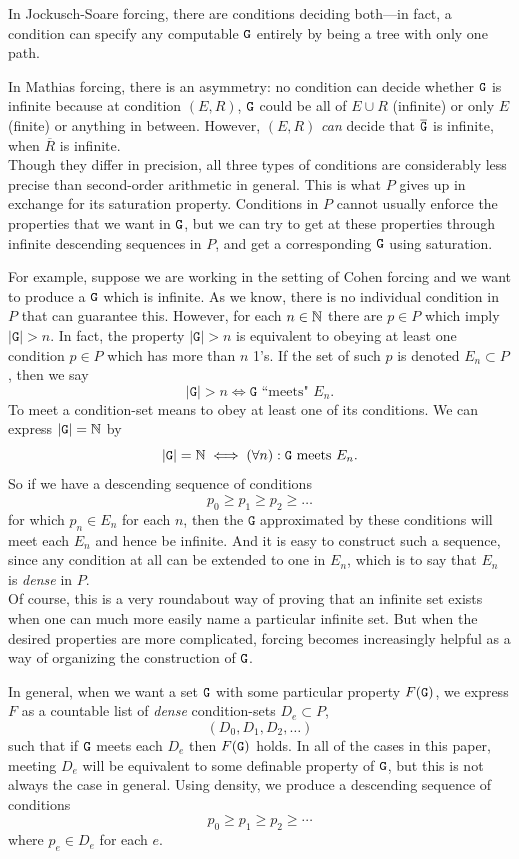 \documentclass{amsart}
\begin{document}
	In Jockusch-Soare forcing, there are conditions deciding both---in fact, a condition can specify any computable $\tt{G}$ entirely by being a tree with only one path.
	
	In Mathias forcing, there is an asymmetry: no condition can decide whether $\tt{G}$ is infinite because at condition $(E,R)$, $\tt{G}$ could be all of $E\cup R$ (infinite) or only $E$ (finite) or anything in between. However, $(E,R)$ \textit{can} decide that $\overline{\tt{G}}$ is infinite, when $\overline{R}$ is infinite.\\
	
	Though they differ in precision, all three types of conditions are considerably less precise than second-order arithmetic in general. This is what $P$ gives up in exchange for its saturation property. Conditions in $P$ cannot usually enforce the properties that we want in $\tt{G}$, but we can try to get at these properties through infinite descending sequences in $P$, and get a corresponding $\tt{G}$ using saturation.
	
	For example, suppose we are working in the setting of Cohen forcing and we want to produce a $\tt{G}$ which is infinite. As we know, there is no individual condition in $P$ that can guarantee this. However, for each $n\in\mathbb{N}$ there are $p\in P$ which imply $|\mathtt{G}|>n$. In fact, the property $|\mathtt{G}|>n$ is equivalent to obeying at least one condition $p\in P$ which has more than $n$ 1's. If the set of such $p$ is denoted $E_n\subset P$, then we say
	$$
	|\mathtt{G}|>n \iff \mathtt{G} \text{ ``meets" } E_n.
	$$
	To meet a condition-set means to obey at least one of its conditions. We can express $|\mathtt{G}|=\mathbb{N}$ by
	$$
	|\mathtt{G}|=\mathbb{N}  \iff (\forall n): \mathtt{G} \text{ meets } E_n.
	$$
	So if we have a descending sequence of conditions 
	$$
	p_0\geq p_1 \geq p_2 \geq \dots
	$$
	for which $p_n\in E_n$ for each $n$, then the $\mathtt{G}$ approximated by these conditions will meet each $E_n$ and hence be infinite. And it is easy to construct such a sequence, since any condition at all can be extended to one in $E_n$, which is to say that $E_n$ is \textit{dense} in $P$.\\
	
	Of course, this is a very roundabout way of proving that an infinite set exists when one can much more easily name a particular infinite set. But when the desired properties are more complicated, forcing becomes increasingly helpful as a way of organizing the construction of $\tt{G}$.
	
	In general, when we want a set $\tt{G}$ with some particular property $F(\tt{G})$, we express $F$ as a countable list of \textit{dense} condition-sets $D_e\subset P$,
	$$
	(D_0,D_1,D_2,\dots)
	$$
	such that if $\tt{G}$ meets each $D_e$ then $F(\tt{G})$ holds. In all of the cases in this paper, meeting $D_e$ will be equivalent to some definable property of $\tt{G}$, but this is not always the case in general. Using density, we produce a descending sequence of conditions
	$$
	p_0 \geq p_1 \geq p_2 \geq \cdots
	$$
	where $p_e\in D_e$ for each $e$. 
	
\end{document}
